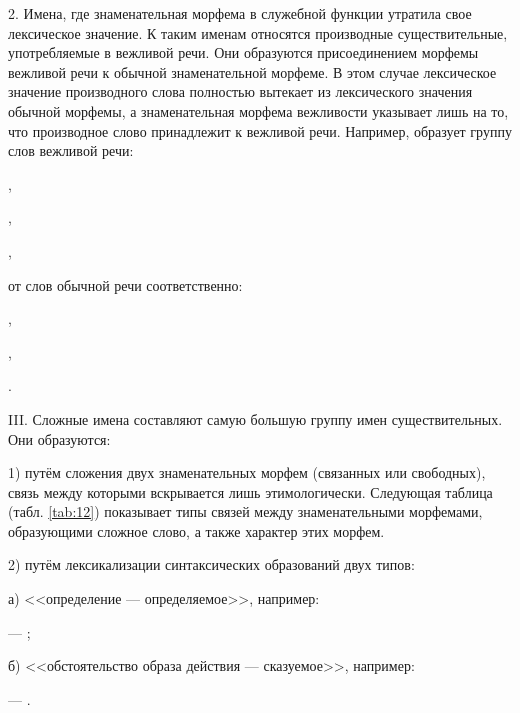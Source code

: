2. Имена, где знаменательная морфема в служебной функции утратила свое лексическое значение. К таким именам относятся производные существительные, употребляемые в вежливой речи. Они образуются присоединением морфемы вежливой речи к обычной знаменательной морфеме. В этом случае лексическое значение производного слова полностью вытекает из лексического значения обычной морфемы, а знаменательная морфема вежливости указывает лишь на то, что производное слово принадлежит к вежливой речи. Например,  образует группу слов вежливой речи:
\begin{prfsample}
    \item {},
    \item {},
    \item {},
\end{prfsample}
от слов обычной речи соответственно:
\begin{prfsample}
    \item {},
    \item {},
    \item {}.
\end{prfsample}

III. Сложные имена составляют самую большую группу имен существительных. Они образуются:

1) путём сложения двух знаменательных морфем (связанных или свободных), связь между которыми вскрывается лишь этимологически. Следующая таблица (табл. \ref{tab:12}) показывает типы связей между знаменательными морфемами, образующими сложное слово, а также характер этих морфем.

2) путём лексикализации синтаксических образований двух типов:

а) <<определение --- определяемое>>, например:
\begin{prfsample}
    \item {}  --- 
;
\end{prfsample}

б) <<обстоятельство образа действия --- сказуемое>>, например:
\begin{prfsample}
    \item {} --- .
\end{prfsample}

